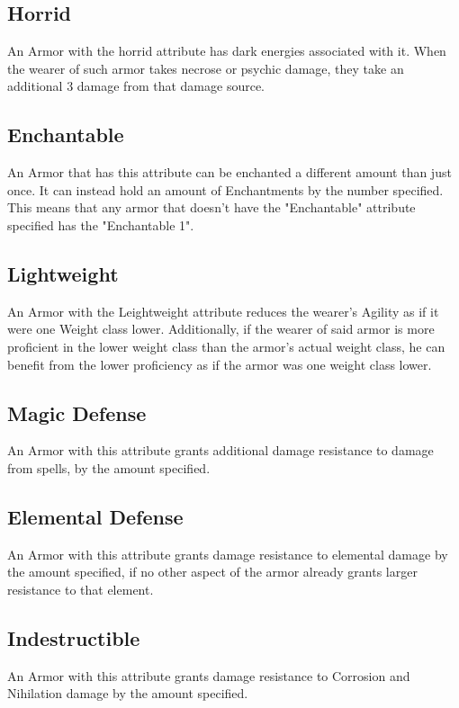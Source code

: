 \subsection{Horrid}\label{armor:horrid}
An Armor with the horrid attribute has dark energies associated with it.
When the wearer of such armor takes necrose or psychic damage, they take an additional 3 damage from that damage source.

\subsection{Enchantable}\label{armor:enchantable}
An Armor that has this attribute can be enchanted a different amount than just once.
It can instead hold an amount of Enchantments by the number specified.
This means that any armor that doesn't have the "Enchantable" attribute specified has the "Enchantable 1".

\subsection{Lightweight}\label{armor:lightweight}
An Armor with the Leightweight attribute reduces the wearer's Agility as if it were one Weight class lower.
Additionally, if the wearer of said armor is more proficient in the lower weight class than the armor's actual weight class, he can benefit from the lower proficiency as if the armor was one weight class lower.

\subsection{Magic Defense}\label{armor:magicDefense}
An Armor with this attribute grants additional damage resistance to damage from spells, by the amount specified.

\subsection{Elemental Defense}\label{armor:elementalDefense}
An Armor with this attribute grants damage resistance to elemental damage by the amount specified, if no other aspect of the armor already grants larger resistance to that element.

\subsection{Indestructible}\label{armor:indestructible}
An Armor with this attribute grants damage resistance to Corrosion and Nihilation damage by the amount specified.

